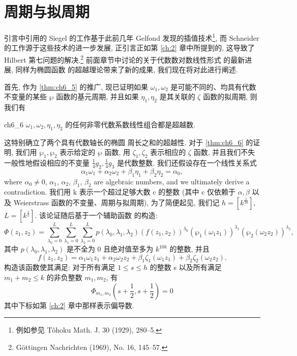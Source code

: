 \section{周期与拟周期}

引言中引用的 Siegel 的工作基于此前几年 Gelfond 发现的插值技术\footnote{例如参见 T{\^o}hoku Math. J. 30 (1929), 280--5.}, 而 Schneider 的工作源于这些技术的进一步发展, 正引言正如第 \ref{ch:2} 章中所提到的, 这导致了 Hilbert 第七问题的解决.\footnote{G{\"{o}}ttingen Nachrichten (1969), No. 16, 145--57.} 前面章节中讨论的关于代数数对数线性形式 的最新进展, 同样为椭圆函数 的超越理论带来了新的成果, 我们现在将对此进行阐述.

首先, 作为 \autoref{thm:ch6_5} 的推广, 现已证明如果 $\omega_1, \omega_2$ 是可能不同的、均具有代数不变量的某些 $\wp$ 函数的基元周期, 并且如果 $\eta_1, \eta_2$ 是其关联的 $\zeta$ 函数的拟周期, 则我们有

\begin{mythm}{}{ch6_6}
$\omega_1, \omega_2, \eta_1, \eta_2$ 的任何非零代数系数线性组合都是超越数.
\end{mythm}

这特别确立了两个具有代数轴长的椭圆 周长之和的超越性. 对于 \autoref{thm:ch6_6} 的证明, 我们用 $\wp_1, \wp_2$ 表示给定的 $\wp$ 函数, 用 $\zeta_1, \zeta_2$ 表示相应的 $\zeta$ 函数, 并且我们不失一般性地假设相应的不变量 $\frac{1}{4}g_2, \frac{1}{4}g_3$ 是代数整数. 我们还假设存在一个线性关系式
\[\alpha_1\omega_1 + \alpha_2\omega_2 + \beta_1\eta_1 + \beta_2\eta_2 = \alpha_0,\]
where $\alpha_0 \neq 0$, $\alpha_1$, $\alpha_2$, $\beta_1$, $\beta_2$ are algebraic numbers, and we ultimately derive a contradiction. 我们用 k 表示一个超过足够大数 c 的整数 (其中 c 仅依赖于 $\alpha, \beta$ 以及 Weierstrass 函数的不变量、周期与拟周期), 为了简便起见, 我们记 $h = [k^{\frac{1}{10}}]$, $L = [k^{\frac{1}{2}}]$. 该论证随后基于一个辅助函数 的构造:
\[\Phi(z_1,z_2) = \sum_{\lambda_0=0}^L \sum_{\lambda_1=0}^L \sum_{\lambda_2=0}^L p(\lambda_0,\lambda_1,\lambda_2) \left( f(z_1,z_2) \right)^{\lambda_0} (\wp_1(\omega_1 z_1))^{\lambda_1} (\wp_2(\omega_2 z_2))^{\lambda_2},\]
其中 $p(\lambda_0, \lambda_1, \lambda_2)$ 是不全为 0 且绝对值至多为 $k^{10k}$ 的整数, 并且
\[f(z_1, z_2) = \alpha_1 \omega_1 z_1 + \alpha_2 \omega_2 z_2 + \beta_1 \zeta_1(\omega_1 z_1) + \beta_2 \zeta_2(\omega_2 z_2).\]
构造该函数使其满足: 对于所有满足 $1 \le s \le h$ 的整数 s 以及所有满足 $m_1 + m_2 \le k$ 的非负整数 $m_1, m_2$, 有
\[\Phi_{m_1, m_2}(s+\frac{1}{2}, s+\frac{1}{2}) = 0\]
其中下标如第 \ref{ch:2} 章中那样表示偏导数.

